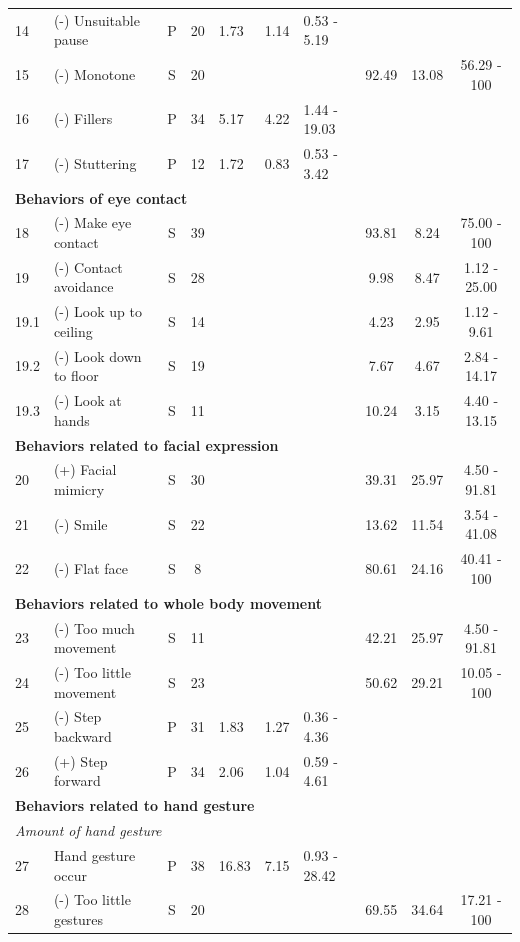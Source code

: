 \begin{table}
{\begin{tabular}{llcclllccc}
14 & (-) Unsuitable pause & P & 20 & 1.73 & 1.14 & 0.53 - 5.19 &  &  &  \\
15 & (-) Monotone & S & 20 &  &  &  & 92.49 & 13.08 & 56.29 - 100 \\
16 & (-) Fillers & P & 34 & 5.17 & 4.22 & 1.44 - 19.03 &  &  &  \\
17 & (-) Stuttering & P & 12 & 1.72 & 0.83 & 0.53 - 3.42 &  &  &  \\ \hline
\multicolumn{10}{l}{\textbf{Behaviors of eye contact}} \\
18 & (-) Make eye contact & S & 39 &  &  &  & 93.81 & 8.24 & 75.00 - 100 \\
19 & (-) Contact avoidance & S & 28 &  &  &  & 9.98 & 8.47 & 1.12 - 25.00 \\
19.1 & (-) Look up to ceiling & S & 14 &  &  &  & 4.23 & 2.95 & 1.12 - 9.61 \\
19.2 & (-) Look down to floor & S & 19 &  &  &  & 7.67 & 4.67 & 2.84 - 14.17 \\
19.3 & (-) Look at hands & S & 11 &  &  &  & 10.24 & 3.15 & 4.40 - 13.15 \\ \hline
\multicolumn{10}{l}{\textbf{Behaviors related to facial expression}} \\
20 & (+) Facial mimicry & S & 30 &  &  &  & 39.31 & 25.97 & 4.50 - 91.81 \\
21 & (-) Smile & S & 22 &  &  &  & 13.62 & 11.54 & 3.54 - 41.08 \\
22 & (-) Flat face & S & 8 &  &  &  & 80.61 & 24.16 & 40.41 - 100 \\ \hline
\multicolumn{10}{l}{\textbf{Behaviors related to whole body movement}} \\
23 & (-) Too much movement & S & 11 &  &  &  & 42.21 & 25.97 & 4.50 - 91.81 \\
24 & (-) Too little movement & S & 23 &  &  &  & 50.62 & 29.21 & 10.05 - 100 \\
25 & (-) Step backward & P & 31 & 1.83 & 1.27 & 0.36 - 4.36 &  &  &  \\
26 & (+) Step forward & P & 34 & 2.06 & 1.04 & 0.59 - 4.61 &  &  &  \\ \hline
\multicolumn{10}{l}{\textbf{Behaviors related to hand gesture}} \\
\multicolumn{10}{l}{\textit{Amount of hand gesture}} \\
27 & Hand gesture occur & P & 38 & 16.83 & 7.15 & 0.93 - 28.42 &  &  &  \\
28 & (-) Too little gestures & S & 20 &  &  &  & 69.55 & 34.64 & 17.21 - 100 \\

\end{tabular}}
\end{table}

